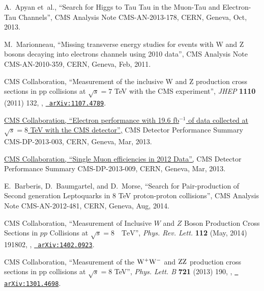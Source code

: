 \documentclass[12pt]{thesis}  %
\begin{document}
\begin{thebibliography}{100}
A.~Apyan\hrefCMSnoop {} { {et~al.}, ``Search for Higgs to Tau Tau in the
  Muon-Tau and Electron-Tau Channels'',} CMS Analysis Note CMS-AN-2013-178,
  CERN, Geneva, Oct, 2013.

\hrefCMSnoop {} {M.~Marionneau, ``Missing transverse energy studies for events
  with W and Z bosons decaying into electrons channels using 2010 data'',} CMS
  Analysis Note CMS-AN-2010-359, CERN, Geneva, Feb, 2011.

\hrefCMSnoop {} {{ CMS} Collaboration, ``{Measurement of the inclusive W and Z
  production cross sections in pp collisions at $\sqrt{s}=7$ TeV with the CMS
  experiment}'',} \textit{ JHEP} \textbf{ 1110} (2011) 132,
  \href{http://dx.doi.org/10.1007/JHEP10(2011)132}{},
\href{http://www.arXiv.org/abs/1107.4789}{\texttt{ arXiv:1107.4789}}.

\href {https://cds.cern.ch/record/1523273} {{ CMS} Collaboration, ``{Electron
  performance with 19.6 fb$^{-1}$ of data collected at $\sqrt{s} = 8$ TeV with
  the CMS detector}'',} CMS Detector Performance Summary CMS-DP-2013-003, CERN,
  Geneva, Mar, 2013.

\href {https://cds.cern.ch/record/1536406} {{ CMS} Collaboration, ``{Single
  Muon efficiencies in 2012 Data}'',} CMS Detector Performance Summary
  CMS-DP-2013-009, CERN, Geneva, Mar, 2013.

\hrefCMSnoop {} {E.~Barberis, D.~Baumgartel, and D.~Morse, ``Search for
  Pair-production of Second generation Leptoquarks in 8 TeV proton-proton
  collisions'',} CMS Analysis Note CMS-AN-2012-481, CERN, Geneva, Aug, 2014.

\hrefCMSnoop {} {{ CMS} Collaboration, ``Measurement of Inclusive $W$ and $Z$
  Boson Production Cross Sections in $pp$ Collisions at $\sqrt{s}=8\text{
  }\text{ }\mathrm{TeV}$'',} \textit{ Phys. Rev. Lett.} \textbf{ 112} (May,
  2014) 191802,
  \href{http://dx.doi.org/10.1103/PhysRevLett.112.191802}{},
  \href{http://www.arXiv.org/abs/1402.0923}{\texttt{ arXiv:1402.0923}}.

\hrefCMSnoop {} {{ CMS} Collaboration, ``Measurement of the $\mathrm{W}^{+}\mathrm{W}^{-}$ and
  $\mathrm{Z}\mathrm{Z}$ production cross sections in pp collisions at $\sqrt{s} = 8$ TeV'',}
  \textit{ Phys. Lett. B} \textbf{ 721} (2013) 190,
  \href{http://dx.doi.org/10.1016/j.physletb.2013.03.027}{},
  \href{http://www.arXiv.org/abs/1301.4698}{\texttt{ arXiv:1301.4698}}.


\end{thebibliography}
\end{document}
